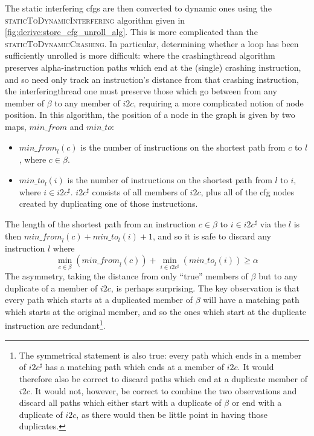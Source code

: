 The static interfering \glspl{cfg} are then converted to dynamic ones
using the \textsc{staticToDynamicInterfering} algorithm given in
\autoref{fig:derive:store_cfg_unroll_alg}.  This is more complicated
than the \textsc{staticToDynamicCrashing}.  In particular, determining
whether a loop has been sufficiently unrolled is more difficult: where
the \gls{crashingthread} algorithm preserves \gls{alpha}-instruction
paths which end at the (single) crashing instruction, and so need only
track an instruction's distance from that crashing instruction, the
\gls{interferingthread} one must preserve those which go between from
any member of $\beta$ to any member of $i2c$, requiring a more
complicated notion of node position.  In this algorithm, the position
of a node in the graph is given by two maps, $\mathit{min\_from}$ and
$\mathit{min\_to}$:
\begin{itemize}
\item
  $\mathit{min\_from}_l(c)$ is the number of instructions on the
  shortest path from $c$ to $l$, where $c \in \beta$.
\item
  $\mathit{min\_to}_l(i)$ is the number of instructions on the
  shortest path from $l$ to $i$, where $i \in i2c^\sharp$.
  $i2c^\sharp$ consists of all members of $i2c$, plus all of the
  \gls{cfg} nodes created by duplicating one of those instructions.
\end{itemize}
The length of the shortest path from an instruction $c
\in \beta$ to $i \in i2c^\sharp$ via the $l$ is then
$\mathit{min\_from}_l(c) + \mathit{min\_to}_l(i) + 1$, and so it is safe
to discard any instruction $l$ where
\begin{displaymath}
\min_{c \in \beta}\left(\mathit{min\_from}_l(c)\right) + \min_{i \in i2c^\sharp}\left(\mathit{min\_to}_l(i)\right) {\geq} \alpha
\end{displaymath}
The asymmetry, taking the distance from only ``true'' members of
$\beta$ but to any duplicate of a member of $i2c$, is perhaps
surprising.  The key observation is that every path which starts at a
duplicated member of $\beta$ will have a matching path which starts at
the original member, and so the ones which start at the duplicate
instruction are redundant\footnote{The symmetrical statement is also
  true: every path which ends in a member of $i2c^\sharp$ has a
  matching path which ends at a member of $i2c$.  It would therefore
  also be correct to discard paths which end at a duplicate member of
  $i2c$.  It would not, however, be correct to combine the two
  observations and discard all paths which either start with a
  duplicate of $\beta$ or end with a duplicate of $i2c$, as there
  would then be little point in having those duplicates.}.

